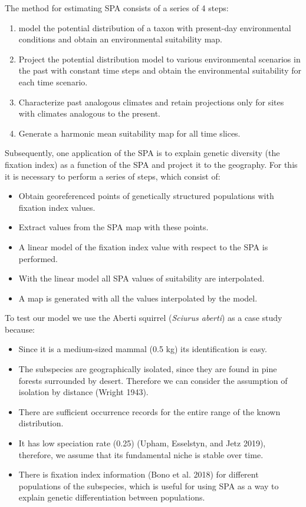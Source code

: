 \documentclass[
]{article}
\providecommand{\tightlist}{%
  \setlength{\itemsep}{0pt}\setlength{\parskip}{0pt}}
\begin{document}
The method for estimating SPA consists of a series of 4 steps:

\begin{enumerate}
\def\labelenumi{\arabic{enumi}.}
\tightlist
\item
  model the potential distribution of a taxon with present-day
  environmental conditions and obtain an environmental suitability map.
\item
  Project the potential distribution model to various environmental
  scenarios in the past with constant time steps and obtain the
  environmental suitability for each time scenario.
\item
  Characterize past analogous climates and retain projections only for
  sites with climates analogous to the present.
\item
  Generate a harmonic mean suitability map for all time slices.
\end{enumerate}

Subsequently, one application of the SPA is to explain genetic diversity
(the fixation index) as a function of the SPA and project it to the
geography. For this it is necessary to perform a series of steps, which
consist of:

\begin{itemize}
\tightlist
\item
  Obtain georeferenced points of genetically structured populations with
  fixation index values.
\item
  Extract values from the SPA map with these points.
\item
  A linear model of the fixation index value with respect to the SPA is
  performed.
\item
  With the linear model all SPA values of suitability are interpolated.
\item
  A map is generated with all the values interpolated by the model.
\end{itemize}

To test our model we use the Aberti squirrel (\emph{Sciurus aberti}) as
a case study because:

\begin{itemize}
\tightlist
\item
  Since it is a medium-sized mammal (0.5 kg) its identification is easy.
\item
  The subspecies are geographically isolated, since they are found in
  pine forests surrounded by desert. Therefore we can consider the
  assumption of isolation by distance (Wright 1943).
\item
  There are sufficient occurrence records for the entire range of the
  known distribution.
\item
  It has low speciation rate (0.25) (Upham, Esselstyn, and Jetz 2019),
  therefore, we assume that its fundamental niche is stable over time.
\item
  There is fixation index information (Bono et al. 2018) for different
  populations of the subspecies, which is useful for using SPA as a way
  to explain genetic differentiation between populations.
\end{itemize}
\end{document}
